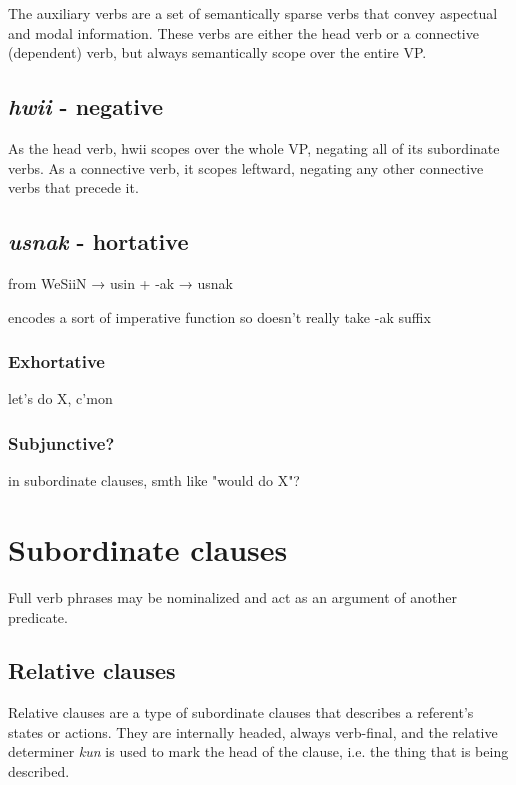 \documentclass[a4paper,10pt,twoside,openright]{memoir}
\begin{document}
The auxiliary verbs are a set of semantically sparse verbs that convey aspectual and modal information. These verbs are either the head verb or a connective (dependent) verb, but always semantically scope over the entire VP.

\subsection{\emph{hwii} - negative}

As the head verb, hwii scopes over the whole VP, negating all of its subordinate verbs. As a connective verb, it scopes leftward, negating any other connective verbs that precede it.

\subsection{\emph{usnak} - hortative}

from WeSiiN → usin + -ak → usnak

encodes a sort of imperative function so doesn't really take -ak suffix

\subsubsection{Exhortative}

let's do X, c'mon

\subsubsection{Subjunctive?}

in subordinate clauses, smth like "would do X"?

\subsubsection{}

\section{Subordinate clauses}

Full verb phrases may be nominalized and act as an argument of another predicate.

\subsection{Relative clauses}

Relative clauses are a type of subordinate clauses that describes a referent's states or actions. They are internally headed, always verb-final, and the relative determiner \emph{kun} is used to mark the head of the clause, i.e. the thing that is being described.
\end{document}
